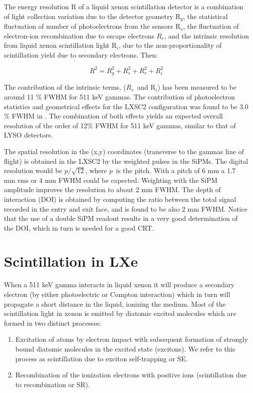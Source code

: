 \documentclass[review]{elsarticle}
\begin{document}
The energy resolution R of a liquid xenon scintillation detector is a combination of light collection variation due to the detector geometry R$_g$, the statistical fluctuation of number of photoelectrons from the sensors R$_s$, the fluctuation of electron-ion recombination due to escape electrons $R_r$, and the intrinsic resolution from liquid xenon scintillation light R$_i$, due to the non-proportionality of scintillation yield due to secondary electrons. Then:

\begin{equation}
R^2 = R_g^2 + R_s^2 + R_r^2 + R_i^2
\end{equation}

The contribution of the intrinsic terms, ($R_r$~and R$_i$) has been measured to be
around 11 \% FWHM \cite{aprileRes} for 511 keV gammas. The contribution of photoelectron statistics and geometrical effects for the LXSC2 configuration was found to be 3.0 \% FWHM
in \cite{Petalo2015}. The combination of both effects yields an expected 
overall resolution of the order of 12\% FWHM for 511 keV gammas, similar to that of LYSO detectors. 

The spatial resolution in the (x,y) coordinates (transverse to the gammas line of flight) is obtained in the LXSC2 by the weighted pulses in the SiPMs. The digital resolution would be
$p/\sqrt{12}$, where $p$~is the pitch. With a pitch of 6 mm a 1.7 mm rms or 4 mm FWHM could be expected. Weighting with the SiPM amplitude improves the resolution to about 2 mm FWHM. The depth of interaction (DOI) is obtained by computing the ratio between the
total signal recorded in the entry and exit face, and is found to be also 2 mm FWHM. Notice that the use of a double SiPM readout results in a very good determination of the DOI, which in turn is needed for a good CRT.  

\section{Scintillation in LXe}

When a 511 keV gamma interacts in liquid xenon it will produce a secondary electron (by either photoelectric or Compton interaction) which in turn will propagate a short distance in the liquid, ionizing the medium. Most of the scintillation light in xenon is emitted by diatomic excited molecules which are formed in two distinct processes:
\begin{enumerate}
\item Excitation of atoms by electron impact with subsequent formation of strongly bound diatomic molecules in the excited state (excitons). We refer to this process as scintillation due to exciton self-trapping or SE.
\item Recombination of the ionization electrons with positive ions (scintillation due to recombination or SR). 
\end{enumerate}
\end{document}
